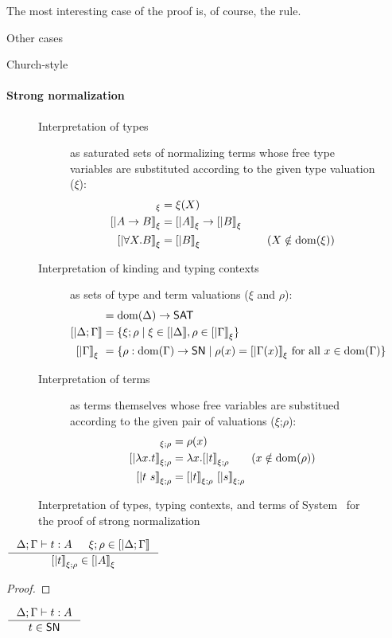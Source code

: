 The most interesting case of the proof is, of course,
the  rule.


Other cases




Church-style

\paragraph{Strong normalization}

\begin{figure}
\begin{singlespace}
\begin{description}
\item[Interpretation of types] as saturated sets of normalizing terms
	whose free type variables are substituted according to
	the given type valuation ($\xi$):
\begin{align*}
[| X |]_\xi           &= \xi(X) \\ 
[| A -> B |]_\xi      &= [|A|]_\xi -> [|B|]_\xi \\
[| \forall X.B |]_\xi &= [|B|]_\xi \qquad\qquad\qquad (X\notin\dom(\xi))
\end{align*}
\item[Interpretation of kinding and typing contexts]
		       as sets of type and term valuations ($\xi$ and $\rho$):
\begin{align*}
[| \Delta        |] &= \dom(\Delta) -> \SAT \\
[| \Delta;\Gamma |] &= \{ \xi;\rho \mid \xi\in[|\Delta|], \rho\in[|\Gamma|]_\xi \} \\
[| \Gamma        |]_\xi\ &= \{ \rho : \dom(\Gamma) -> \SN \mid \rho(x)=[|\Gamma(x)|]_\xi ~\text{for all}~x\in\dom(\Gamma) \}
\end{align*}
\item[Interpretation of terms] as terms themselves whose free variables are
	substitued according to the given pair of valuations ($\xi$;$\rho$):
\begin{align*}
[| x      |]_{\xi;\rho} &= \rho(x) \\
[| \l x.t |]_{\xi;\rho} &= \l x . [|t|]_{\xi;\rho} \qquad (x\notin\dom(\rho)) \\
[| t ~ s  |]_{\xi;\rho} &= [| t |]_{\xi;\rho} ~ [| s |]_{\xi;\rho}
\end{align*}
\end{description}
\caption[Interpretation of System \F\ for proving strong normalization]
	{Interpretation of types, typing contexts, and terms of System \F\
         for the proof of strong normalization}
\label{fig:interpF}
\end{singlespace}
\end{figure}

\begin{theorem}
$ \inference{\Delta;\Gamma|- t:A & \xi;\rho \in [|\Delta;\Gamma|]}
	    {[|t|]_{\xi;\rho} \in [|A|]_\xi} $
\end{theorem}
\begin{proof}
\end{proof}

\begin{corollary}
	$\inference{\Delta;\Gamma |- t : A}{t \in \SN}$
\end{corollary}


